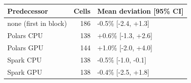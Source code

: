 \begin{tabular}{lrl}
\toprule
Predecessor & Cells & Mean deviation [95\% CI] \\
\midrule
none (first in block) & 186 & -0.5\% [-2.4, +1.3] \\
Polars CPU & 138 & +0.6\% [-1.3, +2.6] \\
Polars GPU & 144 & +1.0\% [-2.0, +4.0] \\
Spark CPU & 138 & -0.5\% [-1.0, -0.1] \\
Spark GPU & 138 & -0.4\% [-2.5, +1.8] \\
\bottomrule
\end{tabular}
